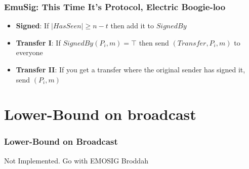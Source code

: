         \begin{frame}
            \frametitle{EmuSig: This Time It's Protocol, Electric Boogie-loo}
                \begin{itemize}
                    \item \textbf{Signed}: If $|HasSeen| \geq n-t$ then add it to $SignedBy$
                    \item \textbf{Transfer I}: If $SignedBy(P_i, m) = \top$ then send $(Transfer, P_i, m)$ to everyone
                    \item \textbf{Transfer II}: If you get a transfer where the original sender has signed it, send $(P_i, m)$
                \end{itemize}
            
        
        \end{frame}


\section{Lower-Bound on broadcast}
        \begin{frame}
            \frametitle{Lower-Bound on Broadcast}
                Not Implemented. Go with EMOSIG Broddah
        \end{frame}



